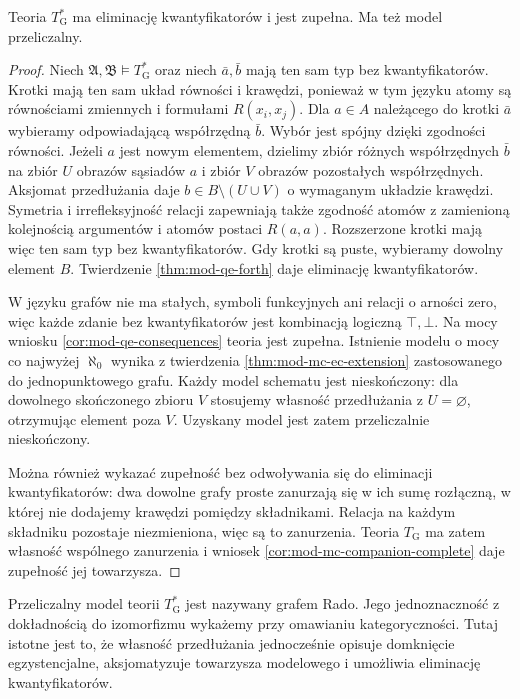 \begin{wniosek}
\label{cor:mod-mc-rado-qe}
Teoria $T_{\mathrm G}^*$ ma eliminację kwantyfikatorów
i jest zupełna. Ma też model przeliczalny.
\end{wniosek}
\begin{proof}
Niech $\mathfrak A,\mathfrak B\models T_{\mathrm G}^*$
oraz niech $\bar a,\bar b$ mają ten sam typ
bez kwantyfikatorów. Krotki mają ten sam układ
równości i krawędzi, ponieważ w tym języku atomy
są równościami zmiennych i formułami $R(x_i,x_j)$.
Dla $a\in A$ należącego do krotki $\bar a$
wybieramy odpowiadającą współrzędną $\bar b$.
Wybór jest spójny dzięki zgodności równości.
Jeżeli $a$ jest nowym elementem, dzielimy zbiór
różnych współrzędnych $\bar b$ na zbiór $U$ obrazów
sąsiadów $a$ i zbiór $V$ obrazów pozostałych
współrzędnych. Aksjomat przedłużania daje
$b\in B\setminus(U\cup V)$ o wymaganym układzie
krawędzi. Symetria i irrefleksyjność relacji
zapewniają także zgodność atomów z zamienioną
kolejnością argumentów i atomów postaci $R(a,a)$.
Rozszerzone krotki mają więc ten sam typ
bez kwantyfikatorów. Gdy krotki są puste,
wybieramy dowolny element $B$.
Twierdzenie \ref{thm:mod-qe-forth} daje eliminację
kwantyfikatorów.

W języku grafów nie ma stałych, symboli funkcyjnych
ani relacji o arności zero, więc każde zdanie
bez kwantyfikatorów jest kombinacją logiczną
$\top,\bot$. Na mocy wniosku
\ref{cor:mod-qe-consequences} teoria jest zupełna.
Istnienie modelu o mocy co najwyżej $\aleph_0$
wynika z twierdzenia \ref{thm:mod-mc-ec-extension}
zastosowanego do jednopunktowego grafu.
Każdy model schematu jest nieskończony: dla dowolnego
skończonego zbioru $V$ stosujemy własność przedłużania
z $U=\varnothing$, otrzymując element poza $V$.
Uzyskany model jest zatem przeliczalnie nieskończony.

Można również wykazać zupełność bez odwoływania się
do eliminacji kwantyfikatorów: dwa dowolne grafy proste
zanurzają się w ich sumę rozłączną, w której nie dodajemy
krawędzi pomiędzy składnikami. Relacja na każdym
składniku pozostaje niezmieniona, więc są to zanurzenia.
Teoria $T_{\mathrm G}$ ma zatem własność wspólnego
zanurzenia i wniosek \ref{cor:mod-mc-companion-complete}
daje zupełność jej towarzysza.
\end{proof}

Przeliczalny model teorii $T_{\mathrm G}^*$ jest
nazywany grafem Rado. Jego jednoznaczność z dokładnością
do izomorfizmu wykażemy przy omawianiu kategoryczności.
Tutaj istotne jest to, że własność przedłużania
jednocześnie opisuje domknięcie egzystencjalne,
aksjomatyzuje towarzysza modelowego i umożliwia
eliminację kwantyfikatorów.

